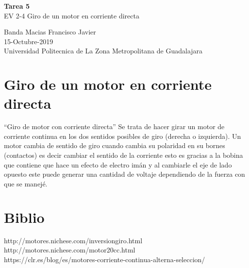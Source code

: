 \documentclass[11pt,a4paper]{article}
\begin{document}
\begin{center}
\textbf{Tarea 5}\\
EV 2-4 Giro de un motor en corriente directa
\end{center}

\begin{center}
Banda Macias Francisco Javier\\
15-Octubre-2019\\
Universidad Politecnica de La Zona Metropolitana de Guadalajara
\end{center}
\section{Giro de un motor en corriente directa}
“Giro de motor con  corriente directa”
Se trata de hacer girar un motor de corriente continua en los dos sentidos posibles de giro (derecha o izquierda).
 Un motor cambia de sentido de giro cuando cambia su polaridad en su bornes (contactos) es decir cambiar el sentido de la corriente esto es gracias a la bobina que contiene que hace un efecto de electro imán y al cambiarle el eje de lado opuesto este puede generar una cantidad de voltaje dependiendo de la fuerza con que se manejé. 
 \section{Biblio}
http://motores.nichese.com/inversiongiro.html\\
http://motores.nichese.com/motor20cc.html\\
https://clr.es/blog/es/motores-corriente-continua-alterna-seleccion/\\
\end{document}
